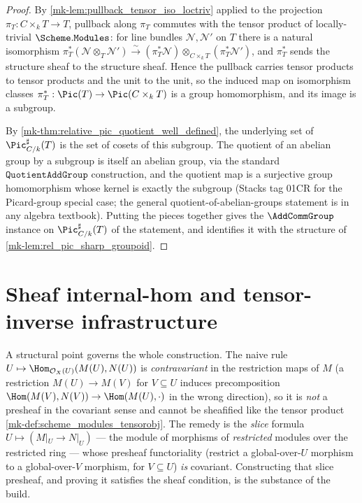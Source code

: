 \begin{proof}
  By \ref{mk-lem:pullback_tensor_iso_loctriv} applied to the projection
  \(\pi_T : C \times_k T \to T\), pullback along \(\pi_T\) commutes with the
  tensor product of locally-trivial \(\Scheme.\mathtt{Modules}\): for line
  bundles \(\mathcal{N}, \mathcal{N}'\) on \(T\) there is a natural isomorphism
  \(\pi_T^*(\mathcal{N} \otimes_T \mathcal{N}')
     \xrightarrow{\sim}
   (\pi_T^*\mathcal{N}) \otimes_{C \times_k T} (\pi_T^*\mathcal{N}')\), and
  \(\pi_T^*\) sends the structure sheaf to the structure sheaf. Hence the
  pullback carries tensor products to tensor products and the unit to the
  unit, so the induced map on isomorphism classes
  \(\pi_T^{*} : \Pic(T) \to \Pic(C \times_k T)\) is a group homomorphism, and
  its image is a subgroup.

  By \ref{mk-thm:relative_pic_quotient_well_defined}, the underlying set of
  \(\Pic^{\sharp}_{C/k}(T)\) is the set of cosets of this subgroup. The
  quotient of an abelian group by a subgroup is itself an abelian group, via
  the standard \(\mathtt{QuotientAddGroup}\) construction, and the quotient
  map is a surjective group homomorphism whose kernel is exactly the subgroup
  (Stacks tag 01CR for the Picard-group special case; the general
  quotient-of-abelian-groups statement is in any algebra textbook). Putting
  the pieces together gives the \(\AddCommGroup\) instance on
  \(\Pic^{\sharp}_{C/k}(T)\) of the statement, and identifies it with the
  structure of \ref{mk-lem:rel_pic_sharp_groupoid}.
\end{proof}

\section{Sheaf internal-hom and tensor-inverse infrastructure}
\label{mk-sec:tensorobj_dual_infra}

A structural point governs the whole construction. The naive rule
\(U \mapsto \Hom_{\mathcal{O}_X(U)}(M(U), N(U))\) is \emph{contravariant} in the
restriction maps of \(M\) (a restriction \(M(U) \to M(V)\) for \(V \subseteq U\)
induces precomposition \(\Hom(M(V), N(V)) \to \Hom(M(U), \cdot)\) in the wrong
direction), so it is \emph{not} a presheaf in the covariant sense and cannot be
sheafified like the tensor product \ref{mk-def:scheme_modules_tensorobj}. The remedy is
the \emph{slice} formula \(U \mapsto (M|_U \to N|_U)\) --- the module of morphisms of
\emph{restricted} modules over the restricted ring --- whose presheaf functoriality
(restrict a global-over-\(U\) morphism to a global-over-\(V\) morphism, for
\(V \subseteq U\)) \emph{is} covariant. Constructing that slice presheaf, and
proving it satisfies the sheaf condition, is the substance of the build.

